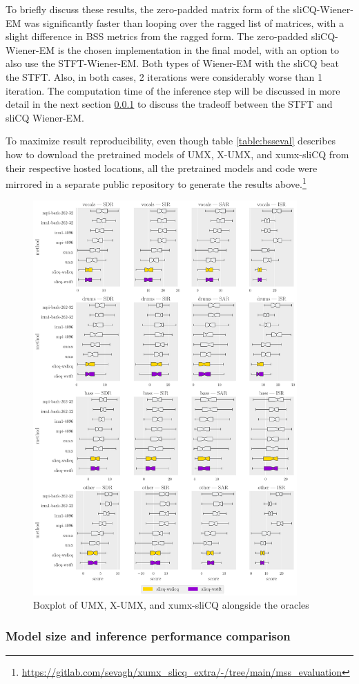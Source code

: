 \documentclass[report.tex]{subfiles}
\begin{document}
To briefly discuss these results, the zero-padded matrix form of the sliCQ-Wiener-EM was significantly faster than looping over the ragged list of matrices, with a slight difference in BSS metrics from the ragged form. The zero-padded sliCQ-Wiener-EM is the chosen implementation in the final model, with an option to also use the STFT-Wiener-EM. Both types of Wiener-EM with the sliCQ beat the STFT. Also, in both cases, 2 iterations were considerably worse than 1 iteration. The computation time of the inference step will be discussed in more detail in the next section \ref{sec:inferenceperf} to discuss the tradeoff between the STFT and sliCQ Wiener-EM.

To maximize result reproducibility, even though table \ref{table:bsseval} describes how to download the pretrained models of UMX, X-UMX, and xumx-sliCQ from their respective hosted locations, all the pretrained models and code were mirrored in a separate public repository to generate the results above.\footnote{\url{https://gitlab.com/sevagh/xumx_slicq_extra/-/tree/main/mss_evaluation}}

\begin{figure}[ht]
	\centering
	\includegraphics[width=0.9\textwidth]{./images-bss/boxplot_full.pdf}
	\caption{Boxplot of UMX, X-UMX, and xumx-sliCQ alongside the oracles}
	\label{fig:bssboxplot}
\end{figure}

\newpagefill

\subsubsection{Model size and inference performance comparison}
\label{sec:inferenceperf}
\end{document}
